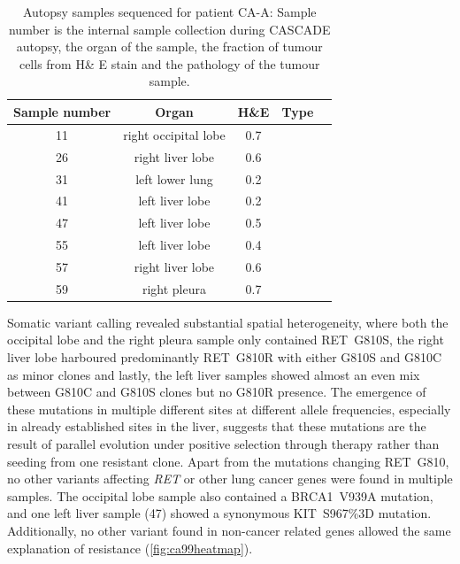 \begin{table}[ht]
\caption[Autopsy samples sequenced for patient CA-A]{Autopsy samples sequenced for patient CA-A: Sample number is the internal sample collection during CASCADE autopsy, the organ of the sample, the fraction of tumour cells from H\& E stain and the pathology of the tumour sample.}\label{tab:ca99wgsSamples}
\centering
{}
\begin{tabular}{|c|c|c|c|c|}
\toprule
\hline
 \rowcolor{gray!50}
\textbf{Sample number} & \textbf{Organ} & \textbf{H\&E} & \textbf{Type}\\
\hline
 11 & right occipital lobe & 0.7 &  \cellcolor{white}\\
 26 & right liver lobe & 0.6 & \cellcolor{white} \\
 31 & left lower lung & 0.2 & \cellcolor{white} \\
 41 & left liver lobe & 0.2 & \cellcolor{white} \\
 47 & left liver lobe & 0.5 & \cellcolor{white} \\
 55 & left liver lobe & 0.4 & \cellcolor{white} \\
 57 & right liver lobe & 0.6 & \cellcolor{white} \\
 59 & right pleura & 0.7 & \cellcolor{white}\multirow{-8}{*}{lung adenocarcinoma} \\
 \hline
\bottomrule
\end{tabular}
\end{table} 

Somatic variant calling revealed substantial spatial heterogeneity, where both the occipital lobe and the right pleura sample only contained RET~G810S, the right liver lobe harboured predominantly RET~G810R with either G810S and G810C as minor clones and lastly, the left liver samples showed almost an even mix between G810C and G810S clones but no G810R presence. The emergence of these mutations in multiple different sites at different allele frequencies, especially in already established sites in the liver, suggests that these mutations are the result of parallel evolution under positive selection through therapy rather than seeding from one resistant clone.
Apart from the mutations changing RET~G810, no other variants affecting \textit{RET} or  other lung cancer genes were found in multiple samples. The occipital lobe sample also contained a BRCA1~V939A mutation, and one left liver sample (47) showed a synonymous KIT~S967\%3D mutation. Additionally, no other variant found in non-cancer related genes allowed the same explanation of resistance (\autoref{fig:ca99heatmap}).

